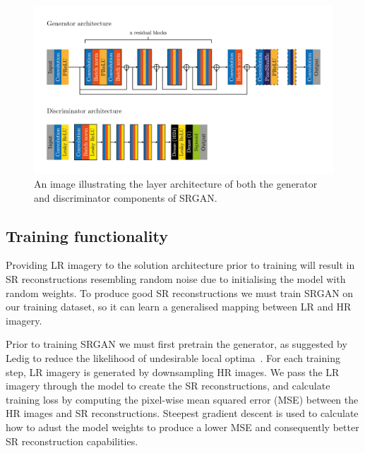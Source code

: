 \begin{figure}
    \includegraphics[width=\linewidth]{./assets/srgan_architecture.png}
    \caption{An image illustrating the layer architecture of both the generator and discriminator components of SRGAN.}
    \label{fig:srgan_architecture}
\end{figure}

\subsection{Training functionality}\label{subsec:training_functionality}
Providing LR imagery to the solution architecture prior to training will result in SR reconstructions resembling random noise due to initialising the model with random weights. To produce good SR reconstructions we must train SRGAN on our training dataset, so it can learn a generalised mapping between LR and HR imagery.

Prior to training SRGAN we must first pretrain the generator, as suggested by Ledig \etal to reduce the likelihood of undesirable local optima~\cite{srgan}. For each training step, LR imagery is generated by downsampling HR images. We pass the LR imagery through the model to create the SR reconstructions, and calculate training loss by computing the pixel-wise mean squared error (MSE) between the HR images and SR reconstructions. Steepest gradient descent is used to calculate how to adust the model weights to produce a lower MSE and consequently better SR reconstruction capabilities.

